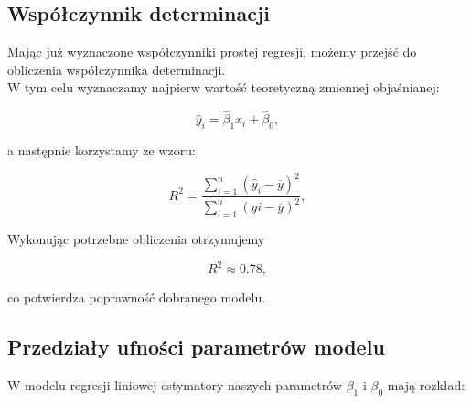 \documentclass[fleqn]{article}
\begin{document}

    
    \subsection{Współczynnik determinacji}
    \noindent Mając już wyznaczone współczynniki prostej regresji, możemy przejść do obliczenia współczynnika determinacji.\\
    W tym celu wyznaczamy najpierw wartość teoretyczną zmiennej objaśnianej:%

    $$\widehat{y}_{i} = \hat \beta_{1}x_{i}+ \hat \beta_{0},$$


    \noindent a następnie korzystamy ze wzoru: %

    $$R^2 = \frac{\sum_{i=1}^n (\widehat{y}_{i} - \overline{y})^2}{\sum_{i=1}^n (y{i} - \overline{y})^2},$$


    \noindent Wykonując potrzebne obliczenia otrzymujemy %

    $$R^2 \approx 0.78,$$


    \noindent co potwierdza poprawność dobranego modelu.
    

    \subsection{Przedziały ufności parametrów modelu}
    W modelu regresji liniowej estymatory naszych parametrów $\beta_{1}$ i $\beta_{0}$ mają rozkład:
\end{document}
